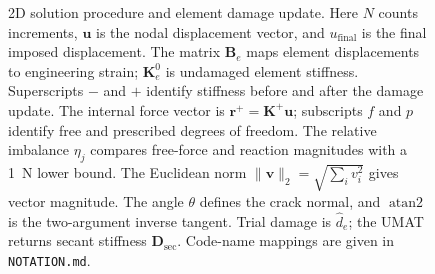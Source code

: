 \documentclass[10pt,a4paper]{article}
\begin{document}
\begin{figure}[!htb]
{}
\caption{2D solution procedure and element damage update. Here $N$ counts increments, $\mathbf u$ is the nodal displacement vector, and $u_{\mathrm{final}}$ is the final imposed displacement. The matrix $\mathbf B_e$ maps element displacements to engineering strain; $\mathbf K_e^0$ is undamaged element stiffness. Superscripts $-$ and $+$ identify stiffness before and after the damage update. The internal force vector is $\mathbf r^+=\mathbf K^+\mathbf u$; subscripts $f$ and $p$ identify free and prescribed degrees of freedom. The relative imbalance $\eta_j$ compares free-force and reaction magnitudes with a 1~N lower bound. The Euclidean norm $\|\mathbf v\|_2=\sqrt{\sum_i v_i^2}$ gives vector magnitude. The angle $\theta$ defines the crack normal, and $\operatorname{atan2}$ is the two-argument inverse tangent. Trial damage is $\widehat{d}_e$; the UMAT returns secant stiffness $\mathbf D_{\mathrm{sec}}$. Code-name mappings are given in \texttt{NOTATION.md}.}
\end{figure}
\end{document}
